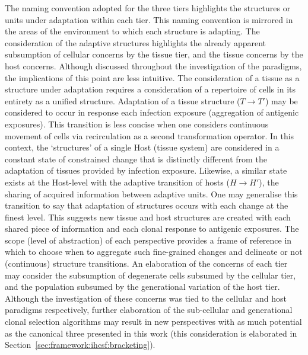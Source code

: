 The naming convention adopted for the three tiers highlights the structures or units under adaptation within each tier. This naming convention is mirrored in the areas of the environment to which each structure is adapting. 
The consideration of the adaptive structures highlights the already apparent subsumption of cellular concerns by the tissue tier, and the tissue concerns by the host concerns. Although discussed throughout the investigation of the paradigms, the implications of this point are less intuitive. The consideration of a tissue as a structure under adaptation requires a consideration of a repertoire of cells in its entirety as a unified structure. Adaptation of a tissue structure ($T \rightarrow T\prime$) may be considered to occur in response each infection exposure (aggregation of antigenic exposures). This transition is less concise when one considers continuous movement of cells via recirculation as a second transformation operator. In this context, the `structures' of a single Host (tissue system) are considered in a constant state of constrained change that is distinctly different from the adaptation of tissues provided by infection exposure. Likewise, a similar state exists at the Host-level with the adaptive transition of hosts ($H \rightarrow H\prime$), the sharing of acquired information between adaptive units. One may generalise this transition to say that adaptation of structures occurs with each change at the finest level. This suggests new tissue and host structures are created with each shared piece of information and each clonal response to antigenic exposures. The scope (level of abstraction) of each perspective provides a frame of reference in which to choose when to aggregate such fine-grained changes and delineate or not (continuous) structure transitions. An elaboration of the concerns of each tier may consider the subsumption of degenerate cells subsumed by the cellular tier, and the population subsumed by the generational variation of the host tier. Although the investigation of these concerns was tied to the cellular and host paradigms respectively, further elaboration of the sub-cellular and generational clonal selection algorithms may result in new perspectives with as much potential as the canonical three presented in this work (this consideration is elaborated in Section~\ref{sec:framework:ihcsf:bracketing}). 

